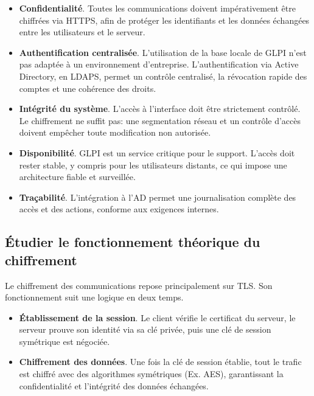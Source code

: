 \begin{itemize}
  \item \textbf{Confidentialité}. Toutes les communications doivent impérativement être chiffrées via HTTPS, afin de protéger les identifiants et les données échangées entre les utilisateurs et le serveur.
  \item \textbf{Authentification centralisée}. L'utilisation de la base locale de GLPI n'est pas adaptée à un environnement d'entreprise. L'authentification via Active Directory, en LDAPS, permet un contrôle centralisé, la révocation rapide des comptes et une cohérence des droits.
  \item \textbf{Intégrité du système}. L'accès à l'interface doit être strictement contrôlé. Le chiffrement ne suffit pas: une segmentation réseau et un contrôle d'accès doivent empêcher toute modification non autorisée.
  \item \textbf{Disponibilité}. GLPI est un service critique pour le support. L'accès doit rester stable, y compris pour les utilisateurs distants, ce qui impose une architecture fiable et surveillée.
  \item \textbf{Traçabilité}. L'intégration à l'AD permet une journalisation complète des accès et des actions, conforme aux exigences internes.
\end{itemize}

\medskip

\subsection*{Étudier le fonctionnement théorique du chiffrement}
{}

\noindent Le chiffrement des communications repose principalement sur TLS. Son fonctionnement suit une logique en deux temps.

\begin{itemize}
  \item \textbf{Établissement de la session}. Le client vérifie le certificat du serveur, le serveur prouve son identité via sa clé privée, puis une clé de session symétrique est négociée.
  \item \textbf{Chiffrement des données}. Une fois la clé de session établie, tout le trafic est chiffré avec des algorithmes symétriques (Ex. AES), garantissant la confidentialité et l'intégrité des données échangées.
\end{itemize}

